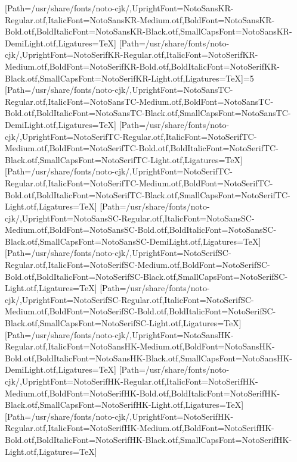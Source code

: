 \newfontfamily{}[Path=/usr/share/fonts/noto-cjk/,UprightFont=NotoSansKR-Regular.otf,ItalicFont=NotoSansKR-Medium.otf,BoldFont=NotoSansKR-Bold.otf,BoldItalicFont=NotoSansKR-Black.otf,SmallCapsFont=NotoSansKR-DemiLight.otf,Ligatures=TeX]
\newfontfamily{}[Path=/usr/share/fonts/noto-cjk/,UprightFont=NotoSerifKR-Regular.otf,ItalicFont=NotoSerifKR-Medium.otf,BoldFont=NotoSerifKR-Bold.otf,BoldItalicFont=NotoSerifKR-Black.otf,SmallCapsFont=NotoSerifKR-Light.otf,Ligatures=TeX]\else\ifnum\value{NotoCJKFamily}=5
\newfontfamily{}[Path=/usr/share/fonts/noto-cjk/,UprightFont=NotoSansTC-Regular.otf,ItalicFont=NotoSansTC-Medium.otf,BoldFont=NotoSansTC-Bold.otf,BoldItalicFont=NotoSansTC-Black.otf,SmallCapsFont=NotoSansTC-DemiLight.otf,Ligatures=TeX]
\newfontfamily{}[Path=/usr/share/fonts/noto-cjk/,UprightFont=NotoSerifTC-Regular.otf,ItalicFont=NotoSerifTC-Medium.otf,BoldFont=NotoSerifTC-Bold.otf,BoldItalicFont=NotoSerifTC-Black.otf,SmallCapsFont=NotoSerifTC-Light.otf,Ligatures=TeX]
\newfontfamily{}[Path=/usr/share/fonts/noto-cjk/,UprightFont=NotoSerifTC-Regular.otf,ItalicFont=NotoSerifTC-Medium.otf,BoldFont=NotoSerifTC-Bold.otf,BoldItalicFont=NotoSerifTC-Black.otf,SmallCapsFont=NotoSerifTC-Light.otf,Ligatures=TeX]
\newfontfamily{}[Path=/usr/share/fonts/noto-cjk/,UprightFont=NotoSansSC-Regular.otf,ItalicFont=NotoSansSC-Medium.otf,BoldFont=NotoSansSC-Bold.otf,BoldItalicFont=NotoSansSC-Black.otf,SmallCapsFont=NotoSansSC-DemiLight.otf,Ligatures=TeX]
\newfontfamily{}[Path=/usr/share/fonts/noto-cjk/,UprightFont=NotoSerifSC-Regular.otf,ItalicFont=NotoSerifSC-Medium.otf,BoldFont=NotoSerifSC-Bold.otf,BoldItalicFont=NotoSerifSC-Black.otf,SmallCapsFont=NotoSerifSC-Light.otf,Ligatures=TeX]
\newfontfamily{}[Path=/usr/share/fonts/noto-cjk/,UprightFont=NotoSerifSC-Regular.otf,ItalicFont=NotoSerifSC-Medium.otf,BoldFont=NotoSerifSC-Bold.otf,BoldItalicFont=NotoSerifSC-Black.otf,SmallCapsFont=NotoSerifSC-Light.otf,Ligatures=TeX]
\newfontfamily{}[Path=/usr/share/fonts/noto-cjk/,UprightFont=NotoSansHK-Regular.otf,ItalicFont=NotoSansHK-Medium.otf,BoldFont=NotoSansHK-Bold.otf,BoldItalicFont=NotoSansHK-Black.otf,SmallCapsFont=NotoSansHK-DemiLight.otf,Ligatures=TeX]
\newfontfamily{}[Path=/usr/share/fonts/noto-cjk/,UprightFont=NotoSerifHK-Regular.otf,ItalicFont=NotoSerifHK-Medium.otf,BoldFont=NotoSerifHK-Bold.otf,BoldItalicFont=NotoSerifHK-Black.otf,SmallCapsFont=NotoSerifHK-Light.otf,Ligatures=TeX]
\newfontfamily{}[Path=/usr/share/fonts/noto-cjk/,UprightFont=NotoSerifHK-Regular.otf,ItalicFont=NotoSerifHK-Medium.otf,BoldFont=NotoSerifHK-Bold.otf,BoldItalicFont=NotoSerifHK-Black.otf,SmallCapsFont=NotoSerifHK-Light.otf,Ligatures=TeX]
